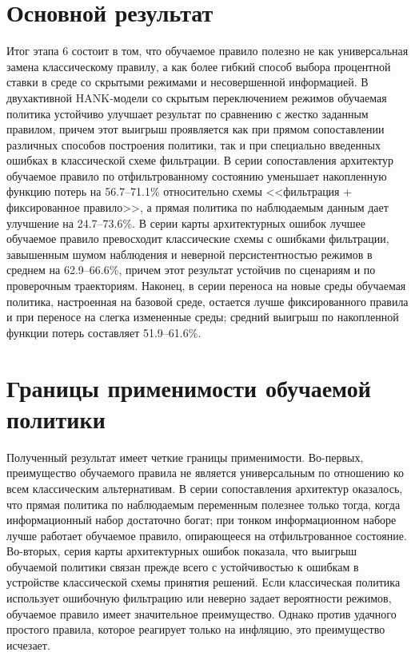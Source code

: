 \section{Основной результат}

Итог этапа 6 состоит в том, что обучаемое правило полезно не как универсальная замена классическому правилу, а как более гибкий способ выбора процентной ставки в среде со скрытыми режимами и несовершенной информацией. В двухактивной HANK-модели со скрытым переключением режимов обучаемая политика устойчиво улучшает результат по сравнению с жестко заданным правилом, причем этот выигрыш проявляется как при прямом сопоставлении различных способов построения политики, так и при специально введенных ошибках в классической схеме фильтрации. В серии сопоставления архитектур обучаемое правило по отфильтрованному состоянию уменьшает накопленную функцию потерь на 56.7--71.1\% относительно схемы <<фильтрация + фиксированное правило>>, а прямая политика по наблюдаемым данным дает улучшение на 24.7--73.6\%. В серии карты архитектурных ошибок лучшее обучаемое правило превосходит классические схемы с ошибками фильтрации, завышенным шумом наблюдения и неверной персистентностью режимов в среднем на 62.9--66.6\%, причем этот результат устойчив по сценариям и по проверочным траекториям. Наконец, в серии переноса на новые среды обучаемая политика, настроенная на базовой среде, остается лучше фиксированного правила и при переносе на слегка измененные среды; средний выигрыш по накопленной функции потерь составляет 51.9--61.6\%.

\begin{table}[htbp]
\centering
\small
\caption{Итоговые результаты этапа 6}
\label{tab:stage6_summary}

\end{table}

\section{Границы применимости обучаемой политики}

Полученный результат имеет четкие границы применимости. Во-первых, преимущество обучаемого правила не является универсальным по отношению ко всем классическим альтернативам. В серии сопоставления архитектур оказалось, что прямая политика по наблюдаемым переменным полезнее только тогда, когда информационный набор достаточно богат; при тонком информационном наборе лучше работает обучаемое правило, опирающееся на отфильтрованное состояние. Во-вторых, серия карты архитектурных ошибок показала, что выигрыш обучаемой политики связан прежде всего с устойчивостью к ошибкам в устройстве классической схемы принятия решений. Если классическая политика использует ошибочную фильтрацию или неверно задает вероятности режимов, обучаемое правило имеет значительное преимущество. Однако против удачного простого правила, которое реагирует только на инфляцию, это преимущество исчезает.

